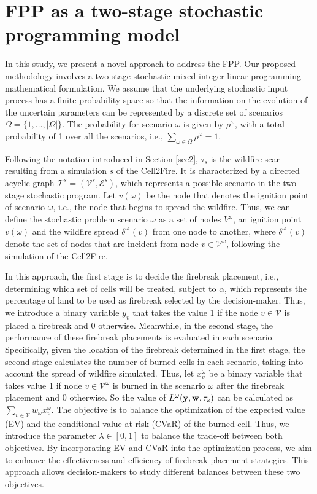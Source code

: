 \documentclass[a4paper,fleqn]{cas-sc}
\begin{document}
\section{FPP as a two-stage stochastic programming model}\label{s:general-model}

In this study, we present a novel approach to address the FPP. Our proposed methodology involves a two-stage stochastic mixed-integer linear programming mathematical formulation.  We assume that the underlying stochastic input process has a finite probability space so that the information on the evolution of the uncertain parameters can be represented by a discrete set of scenarios $\Omega = \{ 1,\dots, |\Omega|\}$. The probability for scenario $\omega$ is given by $\rho^\omega$, with a total probability of 1 over all the scenarios, i.e., $\sum_{\omega \in \Omega} \rho^\omega = 1$.

Following the notation introduced in Section \ref{sec2}, $\tau_s$ is the wildfire scar resulting from a simulation $s$ of the Cell2Fire. It is characterized by a directed acyclic graph $\mathcal{T}^s=(\mathcal{V}^s,\mathcal{E}^s)$, which represents a possible scenario in the two-stage stochastic program. Let $v(\omega)$ be the node that denotes the ignition point of scenario $\omega$, i.e., the node that begins to spread the wildfire. Thus, we can define the stochastic problem scenario $\omega$ as a set of nodes $V^\omega$, an ignition point $v(\omega)$ and  the wildfire spread $\delta^\omega_+(v)$ from one node to another, where $\delta^{\omega}_{+}(v)$ denote the set of nodes that are incident from node $v \in \mathcal{V}^\omega$,  following the simulation of the Cell2Fire.


In this approach, the first stage is to decide the firebreak placement, i.e., determining which set of cells will be treated, subject to $\alpha$, which represents the percentage of land to be used as firebreak selected by the decision-maker. Thus, we introduce a binary variable $y_v$ that takes the value 1 if the node $v \in \mathcal{V}$ is placed a firebreak and 0 otherwise. Meanwhile, in the second stage, the performance of these firebreak placements is evaluated in each scenario. Specifically, given the location of the firebreak determined in the first stage, the second stage calculates the number of burned cells in each scenario, taking into account the spread of wildfire simulated. Thus, let $x^\omega_v$ be a binary variable that takes value 1 if node $v \in \mathcal{V}^\omega$ is burned in the scenario $\omega$ after the firebreak placement and 0 otherwise. So the value of $L^\omega(\vb{y},\vb{w},\tau_s)$ can be calculated as $\sum_{v \in \mathcal{V}} w_\omega x_v^{\omega} $. The objective is to balance the optimization of the expected value (EV) and the conditional value at risk (CVaR) of the burned cell. Thus, we introduce the parameter $\lambda \in [0,1]$ to balance the trade-off between both objectives. By incorporating EV and CVaR into the optimization process, we aim to enhance the effectiveness and efficiency of firebreak placement strategies. This approach allows decision-makers to study different balances between these two objectives.  \\
\end{document}
